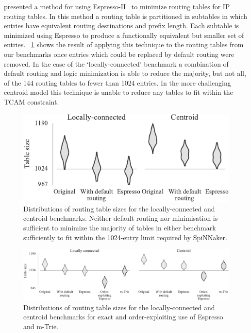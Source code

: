 \documentclass[conference]{IEEEtran}
\begin{document}
\textcite{Liu2002} presented a method for using Espresso-II~\parencite{Brayton1984} to minimize routing tables for IP routing tables.
In this method a routing table is partitioned in subtables in which entries have equivalent routing destinations and prefix length.
Each subtable is minimized using Espresso to produce a functionally equivalent but smaller set of entries.
\figurename~\ref{fig:results/espresso_no_dc} shows the result of applying this technique to the routing tables from our benchmarks once entries which could be replaced by default routing were removed.
In the case of the `locally-connected' benchmark a combination of default routing and logic minimization is able to reduce the majority, but not all, of the 144 routing tables to fewer than 1024 entries.
In the more challenging centroid model this technique is unable to reduce any tables to fit within the TCAM constraint.

\begin{figure}
  \centering
  \includegraphics{experiments/results_no_dc}
  \caption{
    Distributions of routing table sizes for the locally-connected and centroid benchmarks.
    Neither default routing nor minimisation is sufficient to minimize the majority of tables in either benchmark sufficiently to fit within the 1024-entry limit required by SpiNNaker.}
  \label{fig:results/espresso_no_dc}
\end{figure}

\begin{figure}[!t]
  \centering
  \includegraphics{experiments/results_with_esp_dc_and_mtrie}
  \caption{
    Distributions of routing table sizes for the locally-connected and centroid benchmarks for exact and order-exploiting use of Espresso and m-Trie.
  }
  \label{fig:results/espresso_with_dc_and_mtrie}
\end{figure}
\end{document}
